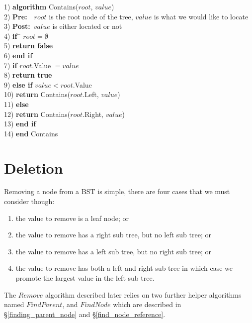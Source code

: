 \newpage
\begin{tabbing}
1)  \textbf{alg}\= \textbf{orithm} Contains($root$, $value$) \\
2)  \> \textbf{Pre:}~~$root$ is the root node of the tree, $value$ is what we would like to locate \\
3)  \> \textbf{Post:}~$value$ is either located or not \\
4)  \> \textbf{if}~\= $root = \emptyset$ \\
5)  \> \> \textbf{return false} \\
6)  \> \textbf{end if} \\
7)  \> \textbf{if} $root$.Value $= value$ \\
8)  \> \> \textbf{return true} \\
9)  \> \textbf{else if} $value < root$.Value \\
10) \> \> \textbf{return} Contains($root$.Left, $value$) \\
11) \> \textbf{else} \\
12) \> \> \textbf{return} Contains($root$.Right, $value$) \\
13) \> \textbf{end if} \\
14) \textbf{end} Contains \\
\end{tabbing}

\section{Deletion}
Removing a node from a BST is simple, there are four cases that we must consider though: 
\begin{enumerate}
\item the value to remove is a leaf node; or
\item the value to remove has a right sub tree, but no left sub tree; or
\item the value to remove has a left sub tree, but no right sub tree; or
\item the value to remove has both a left and right sub tree in which case we promote the largest value in the left sub tree.
\end{enumerate}
The $Remove$ algorithm described later relies on two further helper algorithms named $FindParent$, and $FindNode$ which are described in \S\ref{finding_parent_node} and \S\ref{find_node_reference}.

